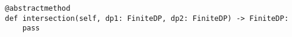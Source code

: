 \par\begin{minipage}{65ex}
\begin{verbatim}
@abstractmethod
def intersection(self, dp1: FiniteDP, dp2: FiniteDP) -> FiniteDP:
    pass
\end{verbatim}
\end{minipage}\par